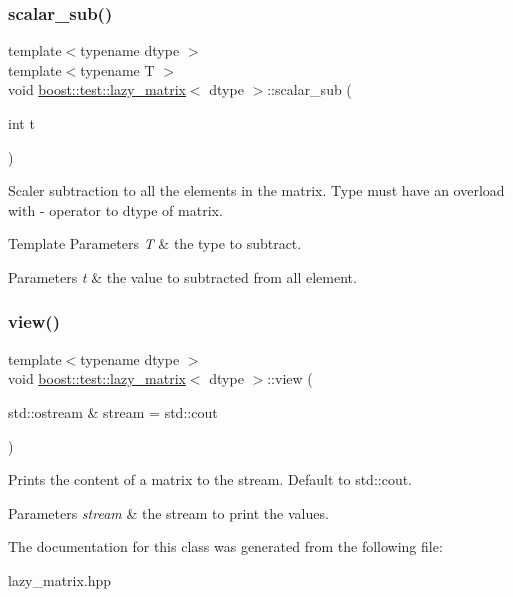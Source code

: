 \subsubsection{\texorpdfstring{scalar\_sub()}{scalar\_sub()}}
{\footnotesize\ttfamily template$<$typename dtype $>$ \\
template$<$typename T $>$ \\
void \mbox{\hyperlink{classboost_1_1test_1_1lazy__matrix}{boost\+::test\+::lazy\+\_\+matrix}}$<$ dtype $>$\+::scalar\+\_\+sub (\begin{DoxyParamCaption}\item[{int}]{t }\end{DoxyParamCaption})\hspace{0.3cm}{\ttfamily [inline]}}



Scaler subtraction to all the elements in the matrix. Type must have an overload with -\/ operator to dtype of matrix. 


\begin{DoxyTemplParams}{Template Parameters}
{\em T} & the type to subtract. \\
\hline
\end{DoxyTemplParams}

\begin{DoxyParams}{Parameters}
{\em t} & the value to subtracted from all element. \\
\hline
\end{DoxyParams}
\mbox{\label{classboost_1_1test_1_1lazy__matrix_ac5f017b3fea88f8bea5bd20f9030b753}} 
\subsubsection{\texorpdfstring{view()}{view()}}
{\footnotesize\ttfamily template$<$typename dtype $>$ \\
void \mbox{\hyperlink{classboost_1_1test_1_1lazy__matrix}{boost\+::test\+::lazy\+\_\+matrix}}$<$ dtype $>$\+::view (\begin{DoxyParamCaption}\item[{std\+::ostream \&}]{stream = {\ttfamily std\+:\+:cout} }\end{DoxyParamCaption})\hspace{0.3cm}{\ttfamily [inline]}}



Prints the content of a matrix to the stream. Default to std\+::cout. 


\begin{DoxyParams}{Parameters}
{\em stream} & the stream to print the values. \\
\hline
\end{DoxyParams}


The documentation for this class was generated from the following file\+:\begin{DoxyCompactItemize}
\item 
lazy\+\_\+matrix.\+hpp\end{DoxyCompactItemize}
